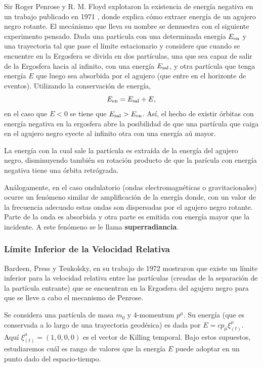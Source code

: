 Sir Roger Penrose y R. M. Floyd explotaron la existencia de energía negativa en un trabajo publicado en 1971 \cite{Penrose71}, donde explica cómo extraer energía de un agujero negro rotante. El mecánismo que lleva su nombre se demuestra con el siguiente experimento pensado. Dada una partícula con una determinada energía $E_{\rm en}$ y una trayectoria tal que pase el límite estacionario y considere que cuando se encuentre en la Ergosfera se divida en dos partículas, una que sea capaz de salir de la Ergosfera hacia al infinito, con una energía $E_{\rm sal}$, y otra partícula que tenga energía $E$ que luego sea absorbida por el agujero (que entre en el horizonte de eventos). Utilizando la conservación de energía,
\begin{equation}
E_{\rm en}=E_{\rm sal}+E,
\end{equation}
en el caso que $E<0$ se tiene que $E_{\rm sal}>E_{\rm en}$. Así, el hecho de existir órbitas con energía negativa en la ergosfera abre la posibilidad de que una partícula que caiga en el agujero negro eyecte al infinito otra con una energía aú mayor.

La energía con la cual sale la partícula es extraída de la energía del agujero negro, disminuyendo también su rotación producto de que la parícula con energía negativa tiene una órbita retrógrada.

Análogamente, en el caso ondulatorio (ondas electromagnéticas o gravitacionales) ocurre un fenómeno similar de amplificación de la energía donde, con un valor de la frecuencia adecuado estas ondas son dispersadas por el agujero negro rotante. Parte de la onda es absorbida y otra parte es emitida con energía mayor que la incidente. A este fenómeno se le llama \textbf{superradiancia}.

\subsubsection{Límite Inferior de la Velocidad Relativa}

Bardeen, Press y Teukolsky, en su trabajo de 1972 \cite{Bardeen72} mostraron que existe un límite inferior para la velocidad relativa entre las partículas (creadas de la separación de la partícula entrante) que se encuentran en la Ergosfera del agujero negro para que se lleve a cabo el mecanismo de Penrose.

Se considera una partícula de masa $m_0$ y 4-momentum $p^\mu$. Su energía (que es conservada a lo largo de una trayectoria geodésica) es dada por $E=cp_{\mu}\xi_{(t)}^{\mu}$. Aquí $\xi_{(t)}^{\mu}=(1,0,0,0)$ es el vector de Killing temporal. Bajo estos supuestos, estudiaremos cuál es rango de valores que la energía $E$ puede adoptar en un punto dado del espacio-tiempo.

